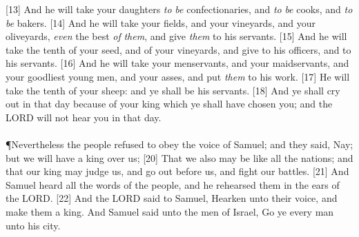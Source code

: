 [13] \textcolor[cmyk]{0.99998,1,0,0}{And he will take your daughters \emph{to} \emph{be} confectionaries, and \emph{to} \emph{be} cooks, and \emph{to} \emph{be} bakers.}
[14] \textcolor[cmyk]{0.99998,1,0,0}{And he will take your fields, and your vineyards, and your oliveyards, \emph{even} the best \emph{of} \emph{them}, and give \emph{them} to his servants.}
[15] \textcolor[cmyk]{0.99998,1,0,0}{And he will take the tenth of your seed, and of your vineyards, and give to his officers, and to his servants.}
[16] \textcolor[cmyk]{0.99998,1,0,0}{And he will take your menservants, and your maidservants, and your goodliest young men, and your asses, and put \emph{them} to his work.}
[17] \textcolor[cmyk]{0.99998,1,0,0}{He will take the tenth of your sheep: and ye shall be his servants.}
[18] \textcolor[cmyk]{0.99998,1,0,0}{And ye shall cry out in that day because of your king which ye shall have chosen you; and the LORD will not hear you in that day.}\\
\\
\P \textcolor[cmyk]{0.99998,1,0,0}{Nevertheless the people refused to obey the voice of Samuel; and they said, Nay; but we will have a king over us;}
[20] \textcolor[cmyk]{0.99998,1,0,0}{That we also may be like all the nations; and that our king may judge us, and go out before us, and fight our battles.}
[21] \textcolor[cmyk]{0.99998,1,0,0}{And Samuel heard all the words of the people, and he rehearsed them in the ears of the LORD.}
[22] \textcolor[cmyk]{0.99998,1,0,0}{And the LORD said to Samuel, Hearken unto their voice, and make them a king. And Samuel said unto the men of Israel, Go ye every man unto his city.}